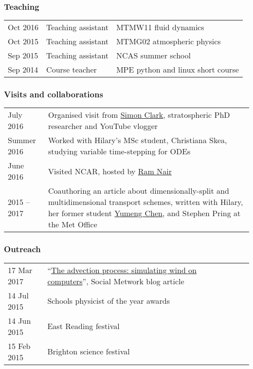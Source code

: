 \documentclass[a4paper,11pt]{article}
\begin{document}
\subsubsection*{Teaching}
\begin{tabular}{l l l}
Oct 2016 & Teaching assistant & MTMW11 fluid dynamics \\
Oct 2015 & Teaching assistant & MTMG02 atmospheric physics \\
Sep 2015 & Teaching assistant & NCAS summer school \\
Sep 2014 & Course teacher & MPE python and linux short course \\
\end{tabular}

\subsubsection*{Visits and collaborations}
\begin{tabularx}{\linewidth}{l X}
July 2016 & Organised visit from \href{https://www.youtube.com/user/SimonOxfPhys}{Simon Clark}, stratospheric PhD researcher and YouTube vlogger \\
Summer 2016 & Worked with Hilary's MSc student, Christiana Skea, studying variable time-stepping for ODEs \\
June 2016 & Visited NCAR, hosted by \href{http://www.image.ucar.edu/staff/rnair/}{Ram Nair} \\
2015 -- 2017 & Coauthoring an article about dimensionally-split and multidimensional transport schemes, written with Hilary, her former student \href{https://www.clisap.de/research/a:-climate-dynamics-and-variability/crg-numerical-methods-in-geosciences/team-members/yumeng-chen/}{Yumeng Chen}, and Stephen Pring at the Met Office \\
\end{tabularx}

\subsubsection*{Outreach}
\begin{tabular}{l l l}
17 Mar 2017 & ``\href{https://thesocialmetwork.wordpress.com/2017/03/17/simulating-wind-on-computers/}{The advection process: simulating wind on computers}'', Social Metwork blog article \\
14 Jul 2015 & Schools physicist of the year awards \\
14 Jun 2015 & East Reading festival \\
15 Feb 2015 & Brighton science festival \\
\end{tabular}
\end{document}
